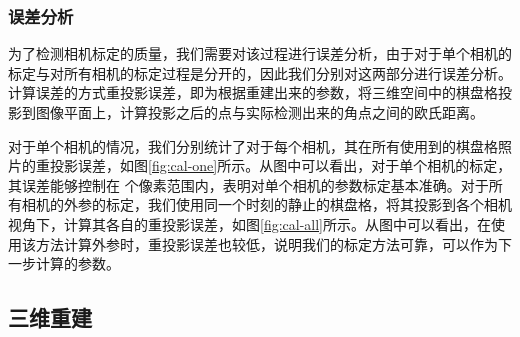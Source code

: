 \subsubsection{误差分析}
为了检测相机标定的质量，我们需要对该过程进行误差分析，由于对于单个相机的标定与对所有相机的标定过程是分开的，因此我们分别对这两部分进行误差分析。计算误差的方式重投影误差，即为根据重建出来的参数，将三维空间中的棋盘格投影到图像平面上，计算投影之后的点与实际检测出来的角点之间的欧氏距离。

对于单个相机的情况，我们分别统计了对于每个相机，其在所有使用到的棋盘格照片的重投影误差，如图\ref{fig:cal-one}所示。从图中可以看出，对于单个相机的标定，其误差能够控制在 个像素范围内，表明对单个相机的参数标定基本准确。对于所有相机的外参的标定，我们使用同一个时刻的静止的棋盘格，将其投影到各个相机视角下，计算其各自的重投影误差，如图\ref{fig:cal-all}所示。从图中可以看出，在使用该方法计算外参时，重投影误差也较低，说明我们的标定方法可靠，可以作为下一步计算的参数。

\subsection{三维重建}

